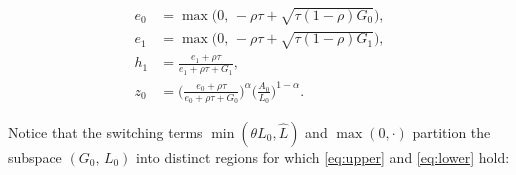 \documentclass[a4paper,fleqn]{cas-sc}
\begin{document}
%
\begin{subequations}\label{eq:accessories}
\begin{align}
    e_0 &= \max\!\Big(0,\,-\rho\tau+\sqrt{\tau(1-\rho)G_0}\Big), \label{eq:accessory_e0}\\
    e_1 &= \max\!\Big(0,\,-\rho\tau+\sqrt{\tau(1-\rho)G_1}\Big), \label{eq:accessory_e1}\\
    h_1 &= \frac{e_1 + \rho\tau}{e_1 + \rho\tau + G_1}, \label{eq:accessory_h1}\\
    z_0 &= \bigg(\frac{e_0 + \rho\tau}{e_0 + \rho\tau + G_0}\bigg)^{\alpha}\bigg(\frac{A_0}{L_0}\bigg)^{1-\alpha}. \label{eq:accessory_z0}
\end{align}
\end{subequations}
%

Notice that the switching terms $\min(\theta L_0,\hat{L})$ and $\max(0,\cdot)$ partition the subspace $(G_0,\,L_0)$ into distinct regions for which \eqref{eq:upper} and \eqref{eq:lower} hold:
%
\end{document}
